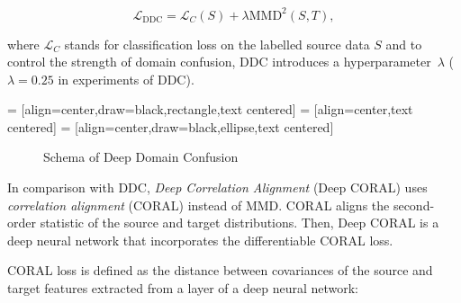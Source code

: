 \begin{equation}
	\mathcal{L}_{\mathrm{DDC}} = \mathcal{L}_C(S)
	+ \lambda \mathrm{MMD}^2(S, T),
	\label{ddc_loss}
\end{equation}

where \(\mathcal{L}_C\) stands for classification loss on the labelled source data \(S\) and to control the strength of domain confusion,
DDC introduces a hyperparameter~\(\lambda\)
(\(\lambda = 0.25\) in experiments of DDC).

 = [align=center,draw=black,rectangle,text centered]
 = [align=center,text centered]
 = [align=center,draw=black,ellipse,text centered]
\begin{figure}
\begin{center}
\end{center}
\caption{Schema of Deep Domain Confusion}
\end{figure}

In comparison with DDC, \textit{Deep Correlation Alignment} (Deep CORAL) uses \textit{correlation alignment} (CORAL) instead of MMD.
CORAL aligns the second-order statistic of the source and target distributions.
Then, Deep CORAL is a deep neural network
that incorporates the differentiable CORAL loss.

CORAL loss is defined as the distance between covariances of the source and target features extracted from a layer of a deep neural network:

